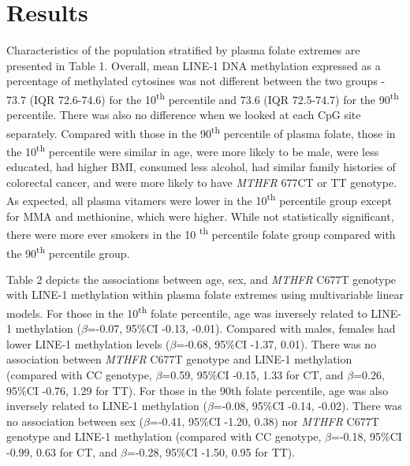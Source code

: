 \section[]{Results} %
\noindent Characteristics of the population stratified by plasma folate extremes are presented in Table 1. Overall, mean LINE-1 DNA methylation expressed as a percentage of methylated cytosines was not different between the two groups - 73.7 (IQR 72.6-74.6) for the 10\textsuperscript{th} percentile and 73.6 (IQR 72.5-74.7) for the 90\textsuperscript{th} percentile. There was also no difference when we looked at each CpG site separately. Compared with those in the 90\textsuperscript{th} percentile of plasma folate, those in the 10\textsuperscript{th} percentile were similar in age, were more likely to be male, were less educated, had higher BMI, consumed less alcohol, had similar family histories of colorectal cancer, and were more likely to have \emph{MTHFR} 677CT or TT genotype. As expected, all plasma vitamers were lower in the 10\textsuperscript{th} percentile group except for MMA and methionine, which were higher. While not statistically significant, there were more ever smokers in the 10\textsuperscript{
th} percentile folate group compared with the 90\textsuperscript{th} percentile group.

\noindent Table 2 depicts the associations between age, sex, and \emph{MTHFR} C677T genotype with LINE-1 methylation within plasma folate extremes using multivariable linear models. For those in the 10\textsuperscript{th} folate percentile, age was inversely related to LINE-1 methylation ($\beta$=-0.07, 95\%CI -0.13, -0.01). Compared with males, females had lower LINE-1 methylation levels ($\beta$=-0.68, 95\%CI -1.37, 0.01). There was no association between \emph{MTHFR} C677T genotype and LINE-1 methylation (compared with CC genotype, $\beta$=0.59, 95\%CI -0.15, 1.33 for CT, and $\beta$=0.26, 95\%CI -0.76, 1.29 for TT). For those in the 90th folate percentile, age was also inversely related to LINE-1 methylation ($\beta$=-0.08, 95\%CI -0.14, -0.02). There was no association between sex ($\beta$=-0.41, 95\%CI -1.20, 0.38) nor \emph{MTHFR} C677T genotype and LINE-1 methylation (compared with CC genotype, $\beta$=-0.18, 95\%CI -0.99, 0.63 for CT, and $\beta$=-0.28, 95\%CI -1.50, 0.95 for TT). 



